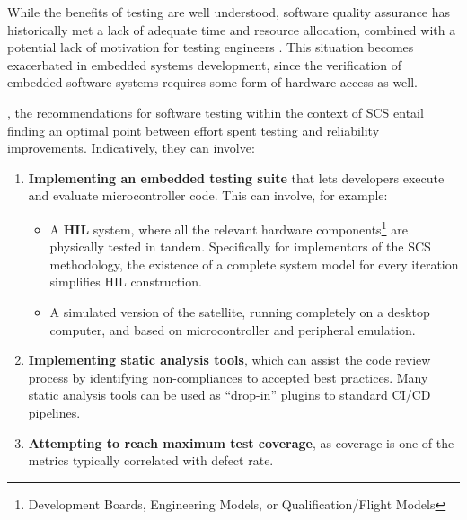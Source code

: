 \documentclass[a4paper,nobib,justified,final]{tufte-book}
\begin{document}
While the benefits of testing are well understood, software quality assurance has historically met a lack of adequate time and resource allocation, combined with a potential lack of motivation for testing engineers \autocite{hardmanTestingNotBoring2025}. This situation becomes exacerbated in embedded systems development, since the verification of embedded software systems requires some form of hardware access as well.

, the recommendations for software testing within the context of \acs{SCS} entail finding an optimal point between effort spent testing and reliability improvements. Indicatively, they can involve:
\begin{enumerate}
	\item \textbf{Implementing an embedded testing suite} that lets developers execute and evaluate microcontroller code. This can involve, for example:
	\begin{itemize}[itemsep=-1ex]
		\item A \textbf{\acf{HIL}} system, where all the relevant hardware components\footnote{Development Boards, Engineering Models, or Qualification/Flight Models} are physically tested in tandem. Specifically for implementors of the \acs{SCS} methodology, the existence of a complete system model for every iteration simplifies \acs{HIL} construction.
		\item A simulated version of the satellite, running completely on a desktop computer, and based on microcontroller and peripheral emulation.
	\end{itemize}
	\item \textbf{Implementing static analysis tools}, which can assist the code review process by identifying non-compliances to accepted best practices. Many static analysis tools can be used as ``drop-in'' plugins to standard \acs{CI}/\acs{CD} pipelines.
	\item \textbf{Attempting to reach maximum test coverage}, as coverage is one of the metrics typically correlated with defect rate.

\end{enumerate}
\end{document}
